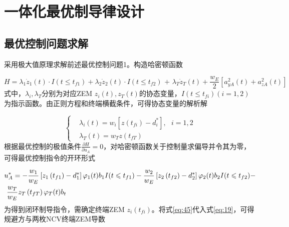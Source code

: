 \section{一体化最优制导律设计}
\subsection{最优控制问题求解}
采用极大值原理求解前述最优控制问题1。构造哈密顿函数

\begin{equation}
\label{eq:43}
H = {\lambda _1}{\dot z_1}(t) \cdot I(t \leqslant {t_{f1}}) + {\lambda _2}{\dot z_2}(t) \cdot I(t \leqslant {t_{f2}}){\text{ + }}{\lambda _T}{\dot z_T}(t) + \frac{{{w_E}}}{2}\left[ {a_{yA}^2(t) + a_{zA}^2(t)} \right]
\end{equation}
式中，${\lambda _i},{\lambda _T}$分别为对应ZEM ${z_i}(t),{z_T}(t)$的协态变量，$I(t \leqslant {t_{fi}})(i = 1,2)$为指示函数。由正则方程和终端横截条件，可得协态变量的解析解

\begin{equation}
\label{eq:44}
\left\{
\begin{aligned}
& {\lambda _i}\left( t \right) = {w_i}\left[ {z\left( {{t_{fi}}} \right) - d_i^*} \right],{\text{ }}i = 1,2 \\
& {\lambda _T}\left( t \right) = {w_T}z\left( {{t_{fT}}} \right)
\end{aligned}
\right.
\end{equation}
根据最优控制的极值条件$\frac{{\partial H}}{{\partial {u_A}}} = 0$，对哈密顿函数关于控制量求偏导并令其为零，可得最优控制指令的开环形式

\begin{equation}
\label{eq:45}
\begin{gathered}
  u_A^* =  - \frac{{{w_1}}}{{{w_E}}}\left[ {{z_1}\left( {{t_{f1}}} \right) - d_1^*} \right]{\varphi _1}(t){b_1}I(t \leqslant {t_{f1}}) - \frac{{{w_2}}}{{{w_E}}}\left[ {{z_2}\left( {{t_{f2}}} \right) - d_2^*} \right]{\varphi _2}(t){b_2}I(t \leqslant {t_{f2}}) -  \hfill \\
  {\text{    }}\frac{{{w_T}}}{{{w_E}}}{z_T}\left( {{t_{fT}}} \right){\varphi _T}(t){b_t} \hfill \\ 
\end{gathered}
\end{equation}
为得到闭环制导指令，需确定终端ZEM ${z_i}({t_{fi}})$。将式\eqref{eq:45}代入式\eqref{eq:19}，可得规避方与两枚NCV终端ZEM导数

